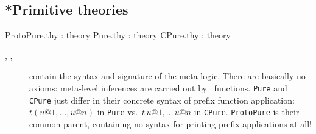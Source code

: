 \subsection{*Primitive theories}
\begin{ttbox}
ProtoPure.thy  : theory
Pure.thy       : theory
CPure.thy      : theory
\end{ttbox}
\begin{description}
\item[, ,
  ] contain the syntax and signature of the
  meta-logic.  There are basically no axioms: meta-level inferences
  are carried out by \ML\ functions.  \texttt{Pure} and \texttt{CPure}
  just differ in their concrete syntax of prefix function application:
  $t(u@1, \ldots, u@n)$ in \texttt{Pure} vs.\ $t\,u@1,\ldots\,u@n$ in
  \texttt{CPure}.  \texttt{ProtoPure} is their common parent,
  containing no syntax for printing prefix applications at all!


\end{description}

